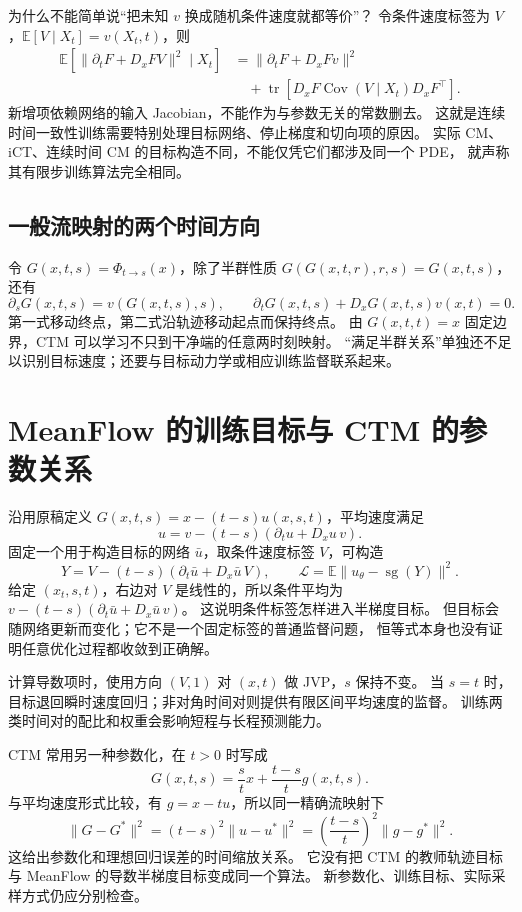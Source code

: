 为什么不能简单说“把未知 $v$ 换成随机条件速度就都等价”？
令条件速度标签为 $V$，$\mathbb E[V\mid X_t]=v(X_t,t)$，则
\begin{align}
\mathbb E[\|\partial_tF+D_xF V\|^2\mid X_t]
 &=\|\partial_tF+D_xF v\|^2\\
 &\quad+\operatorname{tr}\left[D_xF\operatorname{Cov}(V\mid X_t)D_xF^\top\right].
\end{align}
新增项依赖网络的输入 Jacobian，不能作为与参数无关的常数删去。
这就是连续时间一致性训练需要特别处理目标网络、停止梯度和切向项的原因。
实际 CM、iCT、连续时间 CM 的目标构造不同，不能仅凭它们都涉及同一个 PDE，
就声称其有限步训练算法完全相同。\cite{cm,ict,theorybook}

\subsection{一般流映射的两个时间方向}
令 $G(x,t,s)=\Phi_{t\to s}(x)$，除了半群性质
$G(G(x,t,r),r,s)=G(x,t,s)$，还有
\[
\partial_sG(x,t,s)=v(G(x,t,s),s),\qquad
\partial_tG(x,t,s)+D_xG(x,t,s)v(x,t)=0.
\]
第一式移动终点，第二式沿轨迹移动起点而保持终点。
由 $G(x,t,t)=x$ 固定边界，CTM 可以学习不只到干净端的任意两时刻映射。
“满足半群关系”单独还不足以识别目标速度；还要与目标动力学或相应训练监督联系起来。
\cite{ctm}

\section{MeanFlow 的训练目标与 CTM 的参数关系}
沿用原稿定义
$G(x,t,s)=x-(t-s)u(x,s,t)$，平均速度满足
\[
u=v-(t-s)(\partial_tu+D_xu\,v).
\]
固定一个用于构造目标的网络 $\bar u$，取条件速度标签 $V$，可构造
\[
Y=V-(t-s)(\partial_t\bar u+D_x\bar u\,V),\qquad
\mathcal L=\mathbb E\|u_\theta-\operatorname{sg}(Y)\|^2.
\]
给定 $(x_t,s,t)$，右边对 $V$ 是线性的，所以条件平均为
$v-(t-s)(\partial_t\bar u+D_x\bar u\,v)$。
这说明条件标签怎样进入半梯度目标。
但目标会随网络更新而变化；它不是一个固定标签的普通监督问题，
恒等式本身也没有证明任意优化过程都收敛到正确解。\cite{meanflow}

计算导数项时，使用方向 $(V,1)$ 对 $(x,t)$ 做 JVP，$s$ 保持不变。
当 $s=t$ 时，目标退回瞬时速度回归；非对角时间对则提供有限区间平均速度的监督。
训练两类时间对的配比和权重会影响短程与长程预测能力。

CTM 常用另一种参数化，在 $t>0$ 时写成
\[
G(x,t,s)=\frac stx+\frac{t-s}{t}g(x,t,s).
\]
与平均速度形式比较，有 $g=x-tu$，所以同一精确流映射下
\[
\|G-G^*\|^2=(t-s)^2\|u-u^*\|^2
=\left(\frac{t-s}{t}\right)^2\|g-g^*\|^2.
\]
这给出参数化和理想回归误差的时间缩放关系。
它没有把 CTM 的教师轨迹目标与 MeanFlow 的导数半梯度目标变成同一个算法。
新参数化、训练目标、实际采样方式仍应分别检查。


